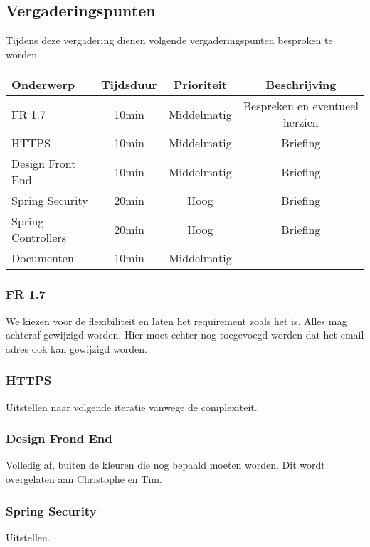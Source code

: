 \subsection{Vergaderingspunten}
Tijdens deze vergadering dienen volgende vergaderingspunten besproken te worden.
\begin{table} [H]
	\centering
	\begin{tabular} {l|c|c|c}
		Onderwerp & Tijdsduur & Prioriteit & Beschrijving \\ %
		\hline
		FR 1.7 & 10min & Middelmatig & Bespreken en eventueel herzien \\
		HTTPS & 10min & Middelmatig & Briefing \\
		Design Front End & 10min & Middelmatig & Briefing \\
		Spring Security & 20min & Hoog & Briefing \\
		Spring Controllers & 20min & Hoog & Briefing \\
		Documenten & 10min & Middelmatig & \\
	\end{tabular}
\end{table}

\subsubsection{FR 1.7}
We kiezen voor de flexibiliteit en laten het requirement zoals het is. Alles mag achteraf gewijzigd worden. Hier moet echter nog toegevoegd worden dat het email adres ook kan gewijzigd worden.

\subsubsection{HTTPS}
Uitstellen naar volgende iteratie vanwege de complexiteit.

\subsubsection{Design Frond End}
Volledig af, buiten de kleuren die nog bepaald moeten worden. Dit wordt overgelaten aan Christophe en Tim.

\subsubsection{Spring Security}
Uitstellen.

